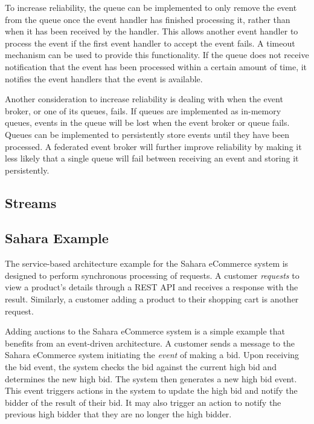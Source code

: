To increase reliability, the queue can be implemented to only remove the event from the queue once the event handler has finished processing it,
rather than when it has been received by the handler.
This allows another event handler to process the event if the first event handler to accept the event fails.
A timeout mechanism can be used to provide this functionality.
If the queue does not receive notification that the event has been processed within a certain amount of time,
it notifies the event handlers that the event is available.

Another consideration to increase reliability is dealing with when the event broker, or one of its queues, fails.
If queues are implemented as in-memory queues, events in the queue will be lost when the event broker or queue fails.
Queues can be implemented to persistently store events until they have been processed.
A federated event broker will further improve reliability by making it less likely that a single queue will fail between receiving an event and storing it persistently.

\subsection{Streams}



\subsection{Sahara Example}

The service-based architecture example for the Sahara eCommerce system is designed to perform synchronous processing of requests.
A customer \emph{requests} to view a product's details through a REST API and receives a response with the result.
Similarly, a customer adding a product to their shopping cart is another request.

Adding auctions to the Sahara eCommerce system is a simple example that benefits from an event-driven architecture.
A customer sends a message to the Sahara eCommerce system initiating the \emph{event} of making a bid.
Upon receiving the bid event, the system checks the bid against the current high bid and determines the new high bid.
The system then generates a new high bid event.
This event triggers actions in the system to update the high bid and notify the bidder of the result of their bid.
It may also trigger an action to notify the previous high bidder that they are no longer the high bidder.

